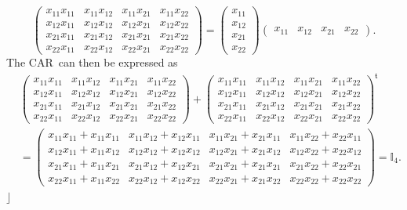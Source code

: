 \documentclass[aps, preprint]{revtex4}
\begin{document}
\begin{equation}\left (\begin{array}{cccc}x_{1 1} x_{1 1} & x_{1 1} x_{1 2} & x_{1 1} x_{2 1} & x_{1 1} x_{2 2} \\
x_{1 2} x_{1 1} & x_{1 2} x_{1 2} & x_{1 2} x_{2 1} & x_{1 2} x_{2 2} \\
x_{2 1} x_{1 1} & x_{2 1} x_{1 2} & x_{2 1} x_{2 1} & x_{2 1} x_{2 2} \\
x_{2 2} x_{1 1} & x_{2 2} x_{1 2} & x_{2 2} x_{2 1} & x_{2 2} x_{2 2}\end{array}\right ) =\left (\begin{array}{c}x_{1 1} \\
x_{1 2} \\
x_{2 1} \\
x_{2 2}\end{array}\right ) \left (\begin{array}{cccc}x_{1 1} & x_{1 2} & x_{2 1} & x_{2 2}\end{array}\right )\text{.}
\end{equation}The CAR\ can then be expressed as
\begin{align} & \left (\begin{array}{cccc}x_{1 1} x_{1 1} & x_{1 1} x_{1 2} & x_{1 1} x_{2 1} & x_{1 1} x_{2 2} \\
x_{1 2} x_{1 1} & x_{1 2} x_{1 2} & x_{1 2} x_{2 1} & x_{1 2} x_{2 2} \\
x_{2 1} x_{1 1} & x_{2 1} x_{1 2} & x_{2 1} x_{2 1} & x_{2 1} x_{2 2} \\
x_{2 2} x_{1 1} & x_{2 2} x_{1 2} & x_{2 2} x_{2 1} & x_{2 2} x_{2 2}\end{array}\right ) +\left (\begin{array}{cccc}x_{1 1} x_{1 1} & x_{1 1} x_{1 2} & x_{1 1} x_{2 1} & x_{1 1} x_{2 2} \\
x_{1 2} x_{1 1} & x_{1 2} x_{1 2} & x_{1 2} x_{2 1} & x_{1 2} x_{2 2} \\
x_{2 1} x_{1 1} & x_{2 1} x_{1 2} & x_{2 1} x_{2 1} & x_{2 1} x_{2 2} \\
x_{2 2} x_{1 1} & x_{2 2} x_{1 2} & x_{2 2} x_{2 1} & x_{2 2} x_{2 2}\end{array}\right )^{\mathfrak{t}} \nonumber  \\
 &  =\left (\begin{array}{cccc}x_{1 1} x_{1 1} +x_{1 1} x_{1 1} & x_{1 1} x_{1 2} +x_{1 2} x_{1 1} & x_{1 1} x_{2 1} +x_{2 1} x_{1 1} & x_{1 1} x_{2 2} +x_{2 2} x_{1 1} \\
x_{1 2} x_{1 1} +x_{1 1} x_{1 2} & x_{1 2} x_{1 2} +x_{1 2} x_{1 2} & x_{1 2} x_{2 1} +x_{2 1} x_{1 2} & x_{1 2} x_{2 2} +x_{2 2} x_{1 2} \\
x_{2 1} x_{1 1} +x_{1 1} x_{2 1} & x_{2 1} x_{1 2} +x_{1 2} x_{2 1} & x_{2 1} x_{2 1} +x_{2 1} x_{2 1} & x_{2 1} x_{2 2} +x_{2 2} x_{2 1} \\
x_{2 2} x_{1 1} +x_{1 1} x_{2 2} & x_{2 2} x_{1 2} +x_{1 2} x_{2 2} & x_{2 2} x_{2 1} +x_{2 1} x_{2 2} & x_{2 2} x_{2 2} +x_{2 2} x_{2 2}\end{array}\right ) =\mathbb{I}_{4}\text{.}\end{align}$\rfloor $ 
\end{document}
